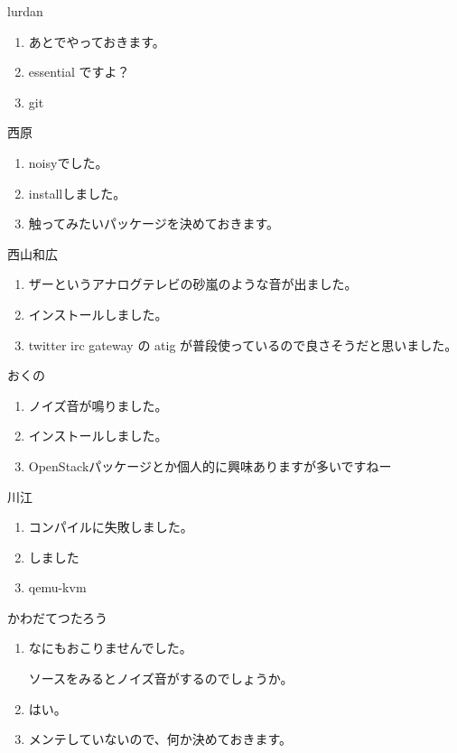 \documentclass[mingoth,a4paper]{jsarticle}
\begin{document}
\begin{prework}{ lurdan }
  \begin{enumerate}
  \item あとでやっておきます。
  \item essential ですよ？
  \item git
  \end{enumerate}
\end{prework}

\begin{prework}{ 西原 }
  \begin{enumerate}
  \item noisyでした。
  \item installしました。
  \item 触ってみたいパッケージを決めておきます。
  \end{enumerate}
\end{prework}

\begin{prework}{ 西山和広 }
  \begin{enumerate}
  \item ザーというアナログテレビの砂嵐のような音が出ました。
  \item インストールしました。
  \item twitter irc gateway の atig が普段使っているので良さそうだと思いました。
  \end{enumerate}
\end{prework}

\begin{prework}{ おくの }
  \begin{enumerate}
  \item ノイズ音が鳴りました。
  \item インストールしました。
  \item OpenStackパッケージとか個人的に興味ありますが多いですねー
  \end{enumerate}
\end{prework}

\begin{prework}{ 川江 }
  \begin{enumerate}
  \item コンパイルに失敗しました。
  \item しました
  \item qemu-kvm
  \end{enumerate}
\end{prework}

\begin{prework}{ かわだてつたろう }
  \begin{enumerate}
  \item なにもおこりませんでした。

    ソースをみるとノイズ音がするのでしょうか。
  \item はい。
  \item メンテしていないので、何か決めておきます。
  \end{enumerate}
\end{prework}
\end{document}
